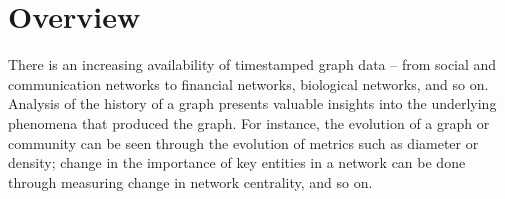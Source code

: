 \documentclass[graybox, natbib, nosecnum, twocolumn]{svmult}
\begin{document}

\section{Overview}
There is an increasing availability of timestamped graph data -- from social and communication networks to financial networks, biological networks, and so on. Analysis of the history of a graph presents valuable insights into the underlying phenomena that produced the graph. For instance, the evolution of a graph or community can be seen through the evolution of metrics such as diameter or density; change in the importance of key entities in a network can be done through measuring change in network centrality, and so on. 
\end{document}

